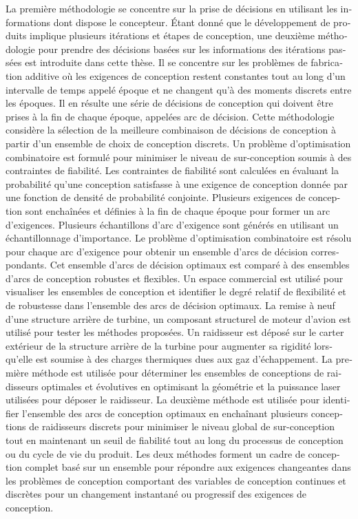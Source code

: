 \documentclass[12pt,Bold,letterpaper,TexShade,twoside]{mcgilletdclass}
\begin{document}
\begin{romanPagenumber}{2}
\begin{otherlanguage}{french}
{La première méthodologie se concentre sur la prise de décisions en utilisant les informations dont dispose le concepteur. Étant donné que le développement de produits implique plusieurs itérations et étapes de conception, une deuxième méthodologie pour prendre des décisions basées sur les informations des itérations passées est introduite dans cette thèse. Il se concentre sur les problèmes de fabrication additive où les exigences de conception restent constantes tout au long d'un intervalle de temps appelé époque et ne changent qu'à des moments discrets entre les époques. Il en résulte une série de décisions de conception qui doivent être prises à la fin de chaque époque, appelées arc de décision. Cette méthodologie considère la sélection de la meilleure combinaison de décisions de conception à partir d'un ensemble de choix de conception discrets. Un problème d'optimisation combinatoire est formulé pour minimiser le niveau de sur-conception soumis à des contraintes de fiabilité. Les contraintes de fiabilité sont calculées en évaluant la probabilité qu'une conception satisfasse à une exigence de conception donnée par une fonction de densité de probabilité conjointe. Plusieurs exigences de conception sont enchaînées et définies à la fin de chaque époque pour former un arc d'exigences. Plusieurs échantillons d'arc d'exigence sont générés en utilisant un échanti\-llonnage d'importance. Le problème d'optimisation combinatoire est résolu pour chaque arc d'exi\-gence pour obtenir un ensemble d'arcs de décision correspondants. Cet ensemble d'arcs de décision optimaux est comparé à des ensembles d'arcs de conception robustes et flexibles. Un espace commercial est utilisé pour visualiser les ensembles de conception et identifier le degré relatif de flexibilité et de robustesse dans l'ensemble des arcs de décision optimaux.
La remise à neuf d'une structure arrière de turbine, un composant structurel de moteur d'avion est utilisé pour tester les méthodes proposées. Un raidisseur est déposé sur le carter extérieur de la structure arrière de la turbine pour augmenter sa rigidité lorsqu'elle est soumise à des charges thermiques dues aux gaz d'échappement. La première méthode est utilisée pour déterminer les ensembles de conceptions de raidisseurs optimales et évolutives en optimisant la géométrie et la puissance laser utilisées pour déposer le raidisseur. La deuxième méthode est utilisée pour identifier l’ensemble des arcs de conception optimaux en enchaînant plusieurs conceptions de raidisseurs discrets pour minimiser le niveau global de sur-conception tout en maintenant un seuil de fiabilité tout au long du processus de conception ou du cycle de vie du produit.
Les deux méthodes forment un cadre de conception complet basé sur un ensemble pour répondre aux exigences changeantes dans les problèmes de conception comportant des variables de conception continues et discrètes pour un changement instantané ou progressif des exigences de conception.}%
\AbstractFr%
\end{otherlanguage}
%
%
%
\tableofcontents %
\listoftables %
\listoffigures %


\end{romanPagenumber}
\end{document}
